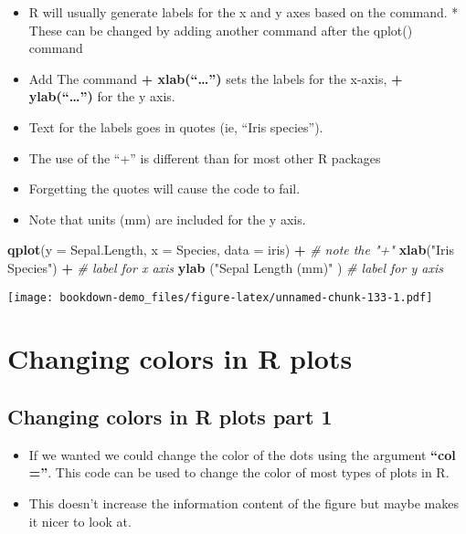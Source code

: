 \documentclass[]{book}
\newenvironment{Shaded}{\begin{snugshade}}{\end{snugshade}}
\newcommand{\KeywordTok}[1]{\textcolor[rgb]{0.13,0.29,0.53}{\textbf{#1}}}
\newcommand{\DataTypeTok}[1]{\textcolor[rgb]{0.13,0.29,0.53}{#1}}
\newcommand{\StringTok}[1]{\textcolor[rgb]{0.31,0.60,0.02}{#1}}
\newcommand{\CommentTok}[1]{\textcolor[rgb]{0.56,0.35,0.01}{\textit{#1}}}
\newcommand{\OperatorTok}[1]{\textcolor[rgb]{0.81,0.36,0.00}{\textbf{#1}}}
\newcommand{\NormalTok}[1]{#1}
\providecommand{\tightlist}{%
  \setlength{\itemsep}{0pt}\setlength{\parskip}{0pt}}
\theoremstyle{definition}
\theoremstyle{definition}
\theoremstyle{definition}
\theoremstyle{remark}
\begin{document}
\begin{itemize}
\tightlist
\item
  R will usually generate labels for the x and y axes based on the
  command. * These can be changed by adding another command after the
  qplot() command
\item
  Add The command \textbf{+ xlab(``\ldots{}'')} sets the labels for the
  x-axis, \textbf{+ ylab(``\ldots{}'')} for the y axis.
\item
  Text for the labels goes in quotes (ie, ``Iris species'').
\item
  The use of the ``+'' is different than for most other R packages
\item
  Forgetting the quotes will cause the code to fail.\\
\item
  Note that units (mm) are included for the y axis.
\end{itemize}

\begin{Shaded}
\begin{Highlighting}[]
\KeywordTok{qplot}\NormalTok{(}\DataTypeTok{y =}\NormalTok{ Sepal.Length,}
      \DataTypeTok{x =}\NormalTok{ Species,    }
        \DataTypeTok{data =}\NormalTok{ iris) }\OperatorTok{+}\StringTok{         }\CommentTok{# note the "+"}
\StringTok{  }\KeywordTok{xlab}\NormalTok{(}\StringTok{"Iris Species"}\NormalTok{) }\OperatorTok{+}\StringTok{       }\CommentTok{# label for x axis}
\StringTok{  }\KeywordTok{ylab}\NormalTok{ (}\StringTok{"Sepal Length (mm)"}\NormalTok{ )  }\CommentTok{# label for y axis}
\end{Highlighting}
\end{Shaded}

\texttt{[image: bookdown-demo\_files/figure-latex/unnamed-chunk-133-1.pdf]}

\section{Changing colors in R plots}\label{changing-colors-in-r-plots}

\subsection{Changing colors in R plots part
1}\label{changing-colors-in-r-plots-part-1}

\begin{itemize}
\tightlist
\item
  If we wanted we could change the color of the dots using the argument
  \textbf{``col =''}. This code can be used to change the color of most
  types of plots in R.\\
\item
  This doesn't increase the information content of the figure but maybe
  makes it nicer to look at.
\end{itemize}
\end{document}
